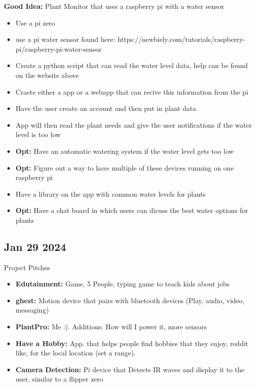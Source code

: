 \documentclass[12pt]{article}
\begin{document}
\textbf{Good Idea:} Plant Monitor that uses a raspberry pi with a water sensor
\begin{itemize}
		  \item Use a pi zero 
		  \item use a pi water sensor found here: https://newbiely.com/tutorials/raspberry-pi/raspberry-pi-water-sensor
		  \item Create a python script that can read the water level data, help can be found on the website above 
		  \item Craete either a app or a webapp that can recive this information from the pi
		  \item Have the user create an account and then put in plant data
		  \item App will then read the plant needs and give the user notifications if the water level is too low
		  \item \textbf{Opt:} Have an automatic watering system if the water level gets too low
		  \item \textbf{Opt:} Figure out a way to have multiple of these devices running on one raspberry pi
		  \item Have a library on the app with common water levels for plants 
		  \item \textbf{Opt:} Have a chat board in which users can dicuss the best water options for plants 
\end{itemize}

\subsection*{Jan 29 2024}

Project Pitches

\begin{itemize}
		  \item \textbf{Edutainment:} Game, 5 People, typing game to teach kids about jobs 
		  \item \textbf{ghest:} Motion device that pairs with bluetooth devices (Play, audio, video, messaging)
		  \item \textbf{PlantPro:} Me :). Additions: How will I power it, more sensors
		  \item \textbf{Have a Hobby:} App. that helps people find hobbies that they enjoy, reddit like, for 
					 the local location (set a range).
		  \item \textbf{Camera Detection:} Pi device that Detects IR waves and display it to the user, similar
					 to a flipper zero
\end{itemize}
\end{document}
